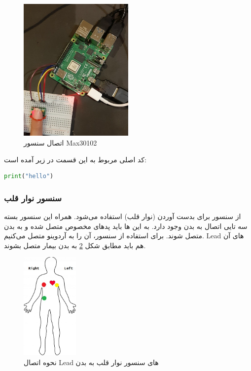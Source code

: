 \begin{figure}[h]
	\centering
	\includegraphics[width=0.5\textwidth]{figs/max30102.jpg}
	
	\caption{اتصال سنسور Max30102}
	\label{fig:5}
\end{figure}

کد اصلی مربوط به این قسمت در زیر آمده است:

\begin{latin}
	\begin{lstlisting}[language=python]
		print("hello")
	\end{lstlisting}
\end{latin}

\subsubsection{سنسور نوار قلب}

از سنسور  برای بدست‌ آوردن  (نوار قلب) استفاده می‌شود. همراه این سنسور بسته  سه تایی اتصال به بدن وجود دارد. به این  ها باید پد‌های مخصوص متصل شده و به بدن متصل شوند. برای استفاده از سنسور،‌ آن را به آردوینو متصل می‌کنیم. Lead های‌ آن هم باید مطابق شکل \ref{fig:6} به بدن بیمار متصل بشوند.

\begin{figure}[h]
	\centering
	\includegraphics[width=0.25\textwidth]{figs/ecg.jpg}
	
	\caption{نحوه اتصال Lead‌ های سنسور نوار قلب به بدن}
	\label{fig:6}
\end{figure}

